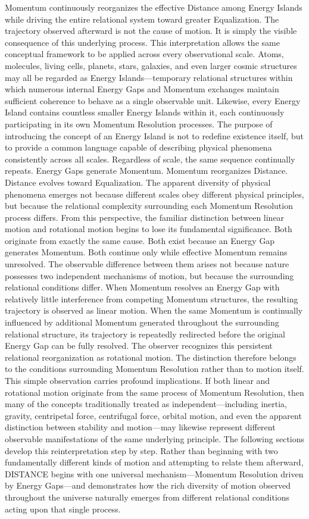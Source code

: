 Momentum continuously reorganizes the effective Distance among Energy Islands while driving the entire relational system toward greater Equalization.
The trajectory observed afterward is not the cause of motion.
It is simply the visible consequence of this underlying process.
This interpretation allows the same conceptual framework to be applied across every observational scale.
Atoms, molecules, living cells, planets, stars, galaxies, and even larger cosmic structures may all be regarded as Energy Islands—temporary relational structures within which numerous internal Energy Gaps and Momentum exchanges maintain sufficient coherence to behave as a single observable unit.
Likewise, every Energy Island contains countless smaller Energy Islands within it, each continuously participating in its own Momentum Resolution processes.
The purpose of introducing the concept of an Energy Island is not to redefine existence itself, but to provide a common language capable of describing physical phenomena consistently across all scales.
Regardless of scale, the same sequence continually repeats.
Energy Gaps generate Momentum.
Momentum reorganizes Distance.
Distance evolves toward Equalization.
The apparent diversity of physical phenomena emerges not because different scales obey different physical principles, but because the relational complexity surrounding each Momentum Resolution process differs.
From this perspective, the familiar distinction between linear motion and rotational motion begins to lose its fundamental significance.
Both originate from exactly the same cause.
Both exist because an Energy Gap generates Momentum.
Both continue only while effective Momentum remains unresolved.
The observable difference between them arises not because nature possesses two independent mechanisms of motion, but because the surrounding relational conditions differ.
When Momentum resolves an Energy Gap with relatively little interference from competing Momentum structures, the resulting trajectory is observed as linear motion.
When the same Momentum is continually influenced by additional Momentum generated throughout the surrounding relational structure, its trajectory is repeatedly redirected before the original Energy Gap can be fully resolved.
The observer recognizes this persistent relational reorganization as rotational motion.
The distinction therefore belongs to the conditions surrounding Momentum Resolution rather than to motion itself.
This simple observation carries profound implications.
If both linear and rotational motion originate from the same process of Momentum Resolution, then many of the concepts traditionally treated as independent—including inertia, gravity, centripetal force, centrifugal force, orbital motion, and even the apparent distinction between stability and motion—may likewise represent different observable manifestations of the same underlying principle.
The following sections develop this reinterpretation step by step.
Rather than beginning with two fundamentally different kinds of motion and attempting to relate them afterward, DISTANCE begins with one universal mechanism—Momentum Resolution driven by Energy Gaps—and demonstrates how the rich diversity of motion observed throughout the universe naturally emerges from different relational conditions acting upon that single process.

